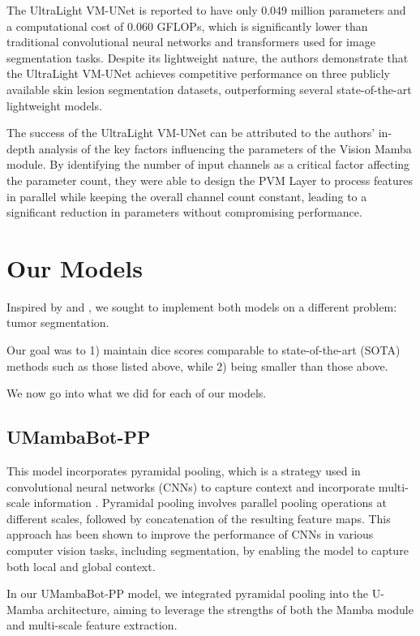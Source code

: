 \documentclass[conference]{IEEEtran}
\begin{document}
The UltraLight VM-UNet is reported to have only 0.049 million parameters and a computational cost of 0.060 GFLOPs, which is significantly lower than traditional convolutional neural networks and transformers used for image segmentation tasks. Despite its lightweight nature, the authors demonstrate that the UltraLight VM-UNet achieves competitive performance on three publicly available skin lesion segmentation datasets, outperforming several state-of-the-art lightweight models.

The success of the UltraLight VM-UNet can be attributed to the authors' in-depth analysis of the key factors influencing the parameters of the Vision Mamba module. By identifying the number of input channels as a critical factor affecting the parameter count, they were able to design the PVM Layer to process features in parallel while keeping the overall channel count constant, leading to a significant reduction in parameters without compromising performance.

\section{Our Models}

Inspired by \cite{U-Mamba} and \cite{ultralightvmunet}, we sought to implement both models on a different problem: tumor segmentation.

Our goal was to 1) maintain dice scores comparable to state-of-the-art (SOTA) methods such as those listed above, while 2) being smaller than those above.

We now go into what we did for each of our models.


\subsection{UMambaBot-PP}

This model incorporates pyramidal pooling, which is a strategy used in convolutional neural networks (CNNs) to capture context and incorporate multi-scale information \cite{zhao2017pyramid}. Pyramidal pooling involves parallel pooling operations at different scales, followed by concatenation of the resulting feature maps. This approach has been shown to improve the performance of CNNs in various computer vision tasks, including segmentation, by enabling the model to capture both local and global context.

In our UMambaBot-PP model, we integrated pyramidal pooling into the U-Mamba architecture, aiming to leverage the strengths of both the Mamba module and multi-scale feature extraction.
\end{document}

